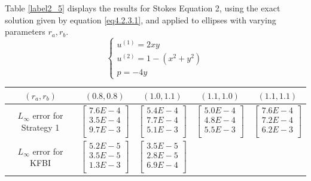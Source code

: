\documentclass{article}
\begin{document}
Table \ref{label2_5} displays the results for Stokes Equation 2, using the exact solution given by equation \eqref{eq4.2.3.1}, and applied to ellipses with varying parameters $r_a, r_b$.
\begin{equation} \label{eq4.2.3.1}
\begin{cases} 
u^{(1)} = 2xy \\
u^{(2)} = 1 - (x^2 + y^2)\\
p = -4 y
\end{cases}
\end{equation}

\begin{table}[ht]
    \centering
    \begin{tabular}{|c|c|c|c|c|} \hline 
         $(r_a, r_b) $ & $(0.8, 0.8)$& $(1.0, 1.1) $& $(1.1, 1.0)$ & $(1.1, 1.1) $\\ \hline 
         $L_{\infty}$ error for Strategy 1 
         & $\begin{bmatrix} 7.6E-4 \\ 3.5E-4 \\ 9.7E-3 \\ \end{bmatrix}$ 
         & $\begin{bmatrix} 5.4E-4 \\ 7.7E-4 \\ 5.1E-3 \\ \end{bmatrix}$  
         &  $\begin{bmatrix} 5.0E-4 \\ 4.8E-4 \\ 5.5E-3 \\ \end{bmatrix}$ 
         &  $\begin{bmatrix} 7.6E-4 \\ 7.2E-4 \\ 6.2E-3 \\ \end{bmatrix}$ \\ \hline
         $L_{\infty}$ error for KFBI 
         &  $\begin{bmatrix} 5.2E-5 \\ 3.5E-5 \\ 1.3E-3 \\ \end{bmatrix}$
         &  $\begin{bmatrix} 3.5E-5 \\ 2.8E-5 \\ 6.9E-4 \\ \end{bmatrix}$ 

\end{tabular}
\end{table}
\end{document}
